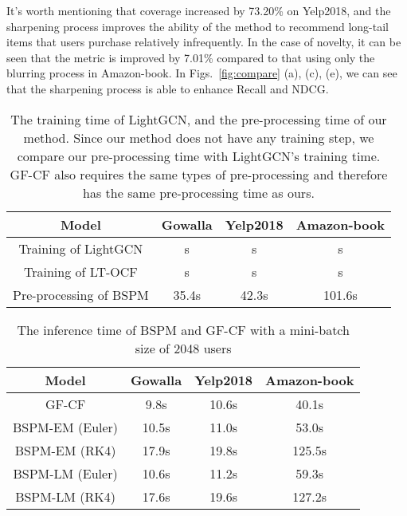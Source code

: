 \documentclass[sigconf,natbib=true]{acmart}
\begin{document}
It's worth mentioning that coverage increased by 73.20\% on Yelp2018, and the sharpening process improves the ability of the method to recommend long-tail items that users purchase relatively infrequently. In the case of novelty, it can be seen that the metric is improved by 7.01\% compared to that using only the blurring process in Amazon-book. In Figs.~\ref{fig:compare} (a), (c), (e), we can see that the sharpening process is able to enhance Recall and NDCG.

\begin{table}[t]
    \small
    \setlength{\tabcolsep}{3pt}
    \centering
    \caption{The training time of LightGCN, and the pre-processing time of our method. Since our method does not have any training step, we compare our pre-processing time with LightGCN's training time. GF-CF also requires the same types of pre-processing and therefore has the same pre-processing time as ours.}
    \begin{tabular}{c c c c}\toprule
        Model  & Gowalla & Yelp2018 & Amazon-book \\
        \midrule
        Training of LightGCN    & s & s & s \\
        Training of LT-OCF      & s & s & s \\
        Pre-processing of BSPM  & 35.4s & 42.3s & 101.6s\\
        \bottomrule
    \end{tabular}
    \label{tbl:runtime1}
\end{table}

\begin{table}[t]
    \small
\centering
    \caption{The inference time of BSPM and GF-CF with a mini-batch size of 2048 users}
    \begin{tabular}{c c c c}\toprule
        Model  & Gowalla & Yelp2018 & Amazon-book \\
        \midrule
GF-CF                   &   9.8s & 10.6s & 40.1s\\
        BSPM-EM (Euler)         &  10.5s & 11.0s & 53.0s\\
        BSPM-EM (RK4)           &  17.9s & 19.8s & 125.5s\\
        BSPM-LM (Euler)         &  10.6s & 11.2s & 59.3s\\
        BSPM-LM (RK4)           &  17.6s & 19.6s & 127.2s\\        
        \bottomrule
    \end{tabular}
    \label{tbl:runtime2}
\end{table}
\end{document}
